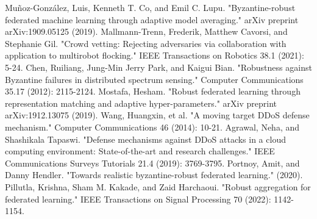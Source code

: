 \documentclass[conference]{IEEEtran}
\begin{document}
\begin{thebibliography}{00}
     Muñoz-González, Luis, Kenneth T. Co, and Emil C. Lupu. "Byzantine-robust federated machine learning through adaptive model averaging." arXiv preprint arXiv:1909.05125 (2019).
     Mallmann-Trenn, Frederik, Matthew Cavorsi, and Stephanie Gil. "Crowd vetting: Rejecting adversaries via collaboration with application to multirobot flocking." IEEE Transactions on Robotics 38.1 (2021): 5-24.
     Chen, Ruiliang, Jung-Min Jerry Park, and Kaigui Bian. "Robustness against Byzantine failures in distributed spectrum sensing." Computer Communications 35.17 (2012): 2115-2124.
     Mostafa, Hesham. "Robust federated learning through representation matching and adaptive hyper-parameters." arXiv preprint arXiv:1912.13075 (2019).
     Wang, Huangxin, et al. "A moving target DDoS defense mechanism." Computer Communications 46 (2014): 10-21.
     Agrawal, Neha, and Shashikala Tapaswi. "Defense mechanisms against DDoS attacks in a cloud computing environment: State-of-the-art and research challenges." IEEE Communications Surveys  Tutorials 21.4 (2019): 3769-3795.
     Portnoy, Amit, and Danny Hendler. "Towards realistic byzantine-robust federated learning." (2020).
     Pillutla, Krishna, Sham M. Kakade, and Zaid Harchaoui. "Robust aggregation for federated learning." IEEE Transactions on Signal Processing 70 (2022): 1142-1154.






\end{thebibliography}
\end{document}
